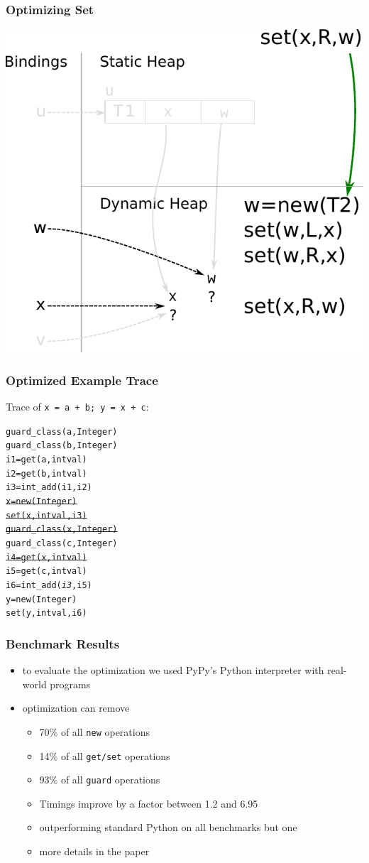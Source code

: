 \documentclass[utf8x]{beamer}
\begin{document}
\begin{frame}[plain]
  \frametitle{Optimizing Set}
  \includegraphics[scale=0.8]{figures/opt_set_dynamic2}
\end{frame}

\begin{frame}[containsverbatim]
  \frametitle{Optimized Example Trace}
  Trace of \texttt{x = a + b; y = x + c}:
\begin{alltt}
guard_class(a, Integer)
guard_class(b, Integer)
i1 = get(a, intval)
i2 = get(b, intval)
i3 = int_add(i1, i2)
\sout{x = new(Integer)}
\sout{set(x, intval, i3)}
\sout{guard_class(x, Integer)}
guard_class(c, Integer)
\sout{i4 = get(x, intval)}
i5 = get(c, intval)
i6 = int_add(\emph{i3}, i5)
y = new(Integer)
set(y, intval, i6)
\end{alltt}
\end{frame}


\begin{frame}
  \frametitle{Benchmark Results}
  \begin{itemize}
      \item to evaluate the optimization we used PyPy's Python interpreter with real-world programs
      \item optimization can remove
      \begin{itemize}
          \item 70\% of all \texttt{new} operations
          \item 14\% of all \texttt{get/set} operations
          \item 93\% of all \texttt{guard} operations
      \pause
      \item Timings improve by a factor between 1.2 and 6.95
      \item outperforming standard Python on all benchmarks but one
      \pause
      \item more details in the paper
      \end{itemize}
  \end{itemize}
\end{frame}
\end{document}
